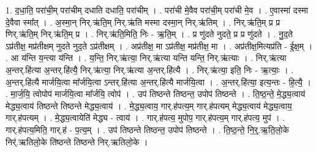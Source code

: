 \documentclass[17pt]{extarticle}
\begin{document}
1. द॒धा॒ति॒ परा॑ची॒म् परा॑चीम् दधाति दधाति॒ परा॑चीम् । . परा॑ची मे॒वैव परा॑ची॒म् परा॑ची मे॒व । . ए॒वास्मा॑ दस्मा दे॒वैवा स्मा᳚त् । . अ॒स्मा॒न् निर्.ऋ॑ति॒म् निर्.ऋ॑ति मस्मा दस्मा॒न् निर्.ऋ॑तिम् । . निर्.ऋ॑ति॒म् प्र प्र णिर्.ऋ॑ति॒म् निर्.ऋ॑ति॒म् प्र । . निर्.ऋ॑ति॒मिति॒ निः - ऋ॒ति॒म् । . प्र णु॑दते नुदते॒ प्र प्र णु॑दते । . नु॒द॒ते ऽप्र॑तीक्ष॒ मप्र॑तीक्षम् नुदते नुद॒ते ऽप्र॑तीक्षम् । . अप्र॑तीक्ष॒ मा ऽप्र॑तीक्ष॒ मप्र॑तीक्ष॒ मा । . अप्र॑तीक्ष॒मित्यप्र॑ति - ई॒क्ष॒म् । . आ य॑न्ति य॒न्त्या य॑न्ति । . य॒न्ति॒ निर्.ऋ॑त्या॒ निर्.ऋ॑त्या यन्ति यन्ति॒ निर्.ऋ॑त्याः । . निर्.ऋ॑त्या अ॒न्तर्.हि॑त्या अ॒न्तर्.हि॑त्यै॒ निर्.ऋ॑त्या॒ निर्.ऋ॑त्या अ॒न्तर्.हि॑त्यै । . निर्.ऋ॑त्या॒ इति॒ निः - ऋ॒त्याः॒ । . अ॒न्तर्.हि॑त्यै मार्जयि॒त्वा मा᳚र्जयि॒त्वा ऽन्तर्.हि॑त्या अ॒न्तर्.हि॑त्यै मार्जयि॒त्वा । . अ॒न्तर्.हि॑त्या॒ इत्य॒न्तः - हि॒त्यै॒ । . मा॒र्ज॒यि॒ त्वोपोप॑ मार्जयि॒त्वा मा᳚र्जयि॒ त्वोप॑ । . उप॑ तिष्ठन्ते तिष्ठन्त॒ उपोप॑ तिष्ठन्ते । . ति॒ष्ठ॒न्ते॒ मे॒द्ध्य॒त्वाय॑ मेद्ध्य॒त्वाय॑ तिष्ठन्ते तिष्ठन्ते मेद्ध्य॒त्वाय॑ । . मे॒द्ध्य॒त्वाय॒ गार्.ह॑पत्य॒म् गार्.ह॑पत्यम् मेद्ध्य॒त्वाय॑ मेद्ध्य॒त्वाय॒ गार्.ह॑पत्यम् । . मे॒द्ध्य॒त्वायेति॑ मेद्ध्य - त्वाय॑ । . गार्.ह॑पत्य॒ मुपोप॒ गार्.ह॑पत्य॒म् गार्.ह॑पत्य॒ मुप॑ । . गार्.ह॑पत्य॒मिति॒ गार्.ह॑ - प॒त्य॒म् । . उप॑ तिष्ठन्ते तिष्ठन्त॒ उपोप॑ तिष्ठन्ते । . ति॒ष्ठ॒न्ते॒ नि॒र्॒.ऋ॒ति॒लो॒के निर्॑.ऋतिलो॒के ति॑ष्ठन्ते तिष्ठन्ते निर्.ऋतिलो॒के । \newline
\end{document}
